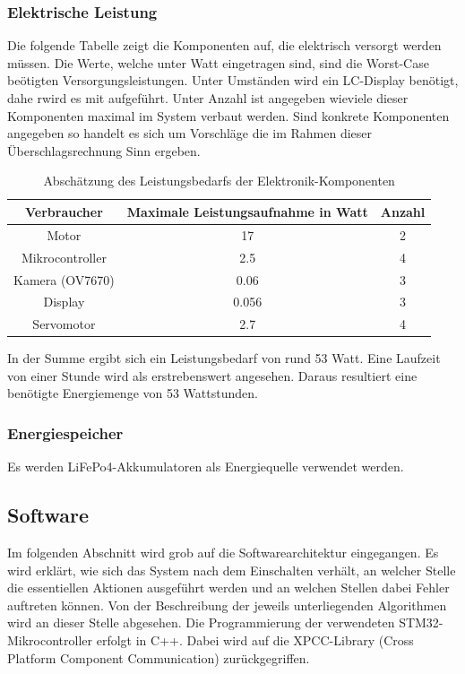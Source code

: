 \subsubsection{Elektrische Leistung}
Die folgende Tabelle zeigt die Komponenten auf, die elektrisch versorgt werden müssen. Die Werte, welche unter Watt eingetragen sind, sind die Worst-Case beötigten Versorgungsleistungen. Unter Umständen wird ein LC-Display benötigt, dahe rwird es mit aufgeführt. Unter Anzahl ist angegeben wieviele dieser Komponenten maximal im System verbaut werden.
Sind konkrete Komponenten angegeben so handelt es sich um Vorschläge die im Rahmen dieser Überschlagsrechnung Sinn ergeben.
\begin{table}[H]
\centering
\begin{tabular}{|c|c|c|}
\hline 
\textbf{Verbraucher} & \textbf{Maximale Leistungsaufnahme in Watt} & \textbf{Anzahl} \\ 
\hline 
Motor & 17 & 2 \\ 
\hline 
Mikrocontroller & 2.5 & 4 \\ 
\hline 
Kamera (OV7670) & 0.06 & 3 \\ 
\hline 
Display & 0.056 & 3 \\ 
\hline 
Servomotor & 2.7 & 4 \\ 
\hline 
\end{tabular}
\caption{Abschätzung des Leistungsbedarfs der Elektronik-Komponenten}
\label{tab:leistung}
\end{table} 
In der Summe ergibt sich ein Leistungsbedarf von rund 53 Watt. Eine Laufzeit von einer Stunde wird als erstrebenswert angesehen. Daraus resultiert eine benötigte Energiemenge von 53 Wattstunden.

\subsubsection{Energiespeicher}
Es werden LiFePo4-Akkumulatoren als Energiequelle verwendet werden.

\subsection{Software}
Im folgenden Abschnitt wird grob auf die Softwarearchitektur eingegangen. Es wird erklärt, wie sich das System nach dem Einschalten verhält, an welcher Stelle die essentiellen Aktionen ausgeführt werden und an welchen Stellen dabei Fehler auftreten können. Von der Beschreibung der jeweils unterliegenden Algorithmen wird an dieser Stelle abgesehen.
Die Programmierung der verwendeten STM32-Mikrocontroller erfolgt in C++. Dabei wird auf die XPCC-Library (Cross Platform Component Communication) zurückgegriffen.


